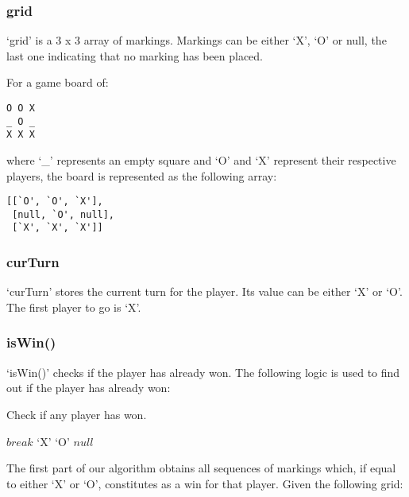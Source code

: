 \documentclass{article}
\newcommand{\qt}[1]{\mbox{`#1'}}
\begin{document}
\subsubsection{grid}

`grid' is a 3 x 3 array of markings. Markings can be either `X', `O' or null, the last one indicating that no marking has been placed.

For a game board of:

\begin{verbatim}
O O X
_ O _
X X X
\end{verbatim}

where `\_' represents an empty square and `O' and `X' represent their respective players, the board is represented as the following array:

\begin{verbatim}
[[`O', `O', `X'],
 [null, `O', null],
 [`X', `X', `X']]
\end{verbatim}

\subsubsection{curTurn}

`curTurn' stores the current turn for the player. Its value can be either `X' or `O'. The first player to go is `X'.

\subsubsection{isWin()}

`isWin()' checks if the player has already won. The following logic is used to find out if the player has already won:

\begin{algorithm}
\caption{Check if any player has won.}

\begin{algorithmic}[1]
        $break$
      \EndIf
    \EndFor
    \If{$seq[0] = \qt{X}$}
      \Return $\qt{X}$
    \ElsIf{$seq[0] = \qt{O}$}
      \Return $\qt{O}$
    \EndIf
  \EndFor
  \Return $null$
\EndProcedure
\end{algorithmic}
\end{algorithm}

The first part of our algorithm obtains all sequences of markings which, if equal to either `X' or `O', constitutes as a win for that player. Given the following grid:
\end{document}
